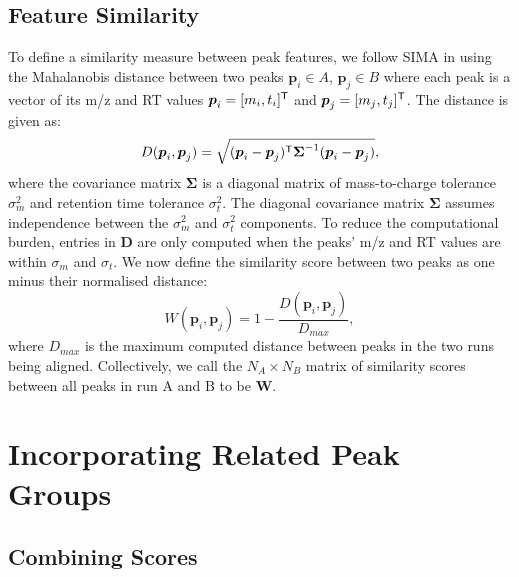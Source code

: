 \subsection{Feature Similarity}

To define a similarity measure between peak features, we follow SIMA \cite{Voss2011a} in using the Mahalanobis distance between two peaks $\boldsymbol{p}_{i}\in A$, $\boldsymbol{p}_{j}\in B$ where each peak is a vector of its m/z and RT values $\boldsymbol{p}_{i}=[m_{i},t_{i}]^{\mathsf{T}}$ and $\boldsymbol{p}_{j}=[m_{j},t_{j}]^{\mathsf{T}}$. The distance is given as: 
\[
D(\boldsymbol{p}_{i},\boldsymbol{p}_{j})=\sqrt{(\boldsymbol{p}_{i}-\boldsymbol{p}_{j})^{\mathsf{T}}\boldsymbol{\Sigma}^{-1}(\boldsymbol{p}_{i}-\boldsymbol{p}_{j})},
\]
where the covariance matrix $\boldsymbol{\Sigma}$ is a diagonal matrix of mass-to-charge tolerance $\sigma^2_{m}$ and retention time tolerance $\sigma^2_{t}$. The diagonal covariance matrix $\boldsymbol{\Sigma}$ assumes independence between the $\sigma^2_{m}$ and $\sigma^2_{t}$ components. To reduce the computational burden, entries in $\boldsymbol{D}$ are only computed when the peaks' m/z and RT values are within $\sigma_{m}$ and $\sigma_{t}$. We now define the similarity score between two peaks as one minus their normalised distance:
\begin{equation}
W(\boldsymbol{p}_{i},\boldsymbol{p}_{j})=1-\frac{D(\boldsymbol{p}_{i},\boldsymbol{p}_{j})}{D_{max}},
\end{equation}
where $D_{max}$ is the maximum computed distance between peaks in the two runs being aligned. Collectively, we call the $N_A\times N_B$ matrix of similarity scores between all peaks in run A and B to be $\boldsymbol{W}$. 

\section{Incorporating Related Peak Groups\label{sub:incorporating-grouping}}

\subsection{Combining Scores}

